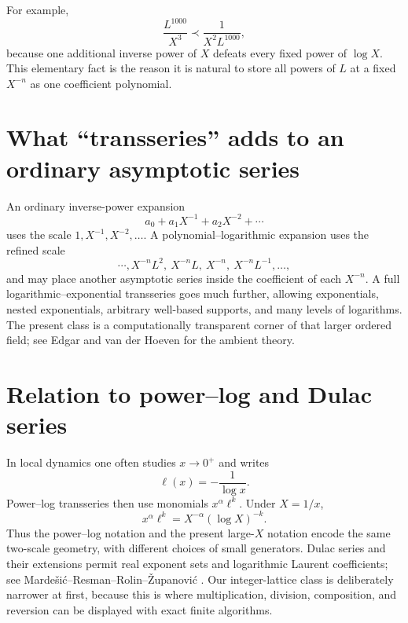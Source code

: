\documentclass[11pt,oneside]{book}
\theoremstyle{definition}
\theoremstyle{remark}
\newcommand{\precdom}{\prec}
\begin{document}
For example,
\[
 \frac{L^{1000}}{X^3}\precdom\frac{1}{X^2L^{1000}},
\]
because one additional inverse power of $X$ defeats every fixed power of
$\log X$.  This elementary fact is the reason it is natural to store all
powers of $L$ at a fixed $X^{-n}$ as one coefficient polynomial.

\section{What ``transseries'' adds to an ordinary asymptotic series}
An ordinary inverse-power expansion
\[
 a_0+a_1X^{-1}+a_2X^{-2}+\cdots
\]
uses the scale $1,X^{-1},X^{-2},\ldots$.  A polynomial--logarithmic expansion
uses the refined scale
\[
 \cdots, X^{-n}L^2,\ X^{-n}L,\ X^{-n},\ X^{-n}L^{-1},\ldots,
\]
and may place another asymptotic series inside the coefficient of each
$X^{-n}$.  A full logarithmic--exponential transseries goes much further,
allowing exponentials, nested exponentials, arbitrary well-based supports,
and many levels of logarithms.  The present class is a computationally
transparent corner of that larger ordered field; see Edgar
\cite{EdgarBeginners,EdgarComposition} and van der Hoeven
\cite{vdHoeven2006} for the ambient theory.

\section{Relation to power--log and Dulac series}
In local dynamics one often studies $x\to0^+$ and writes
\[
 \ell(x)=-\frac{1}{\log x}.
\]
Power--log transseries then use monomials $x^\alpha\ell^k$.  Under $X=1/x$,
\[
 x^\alpha\ell^k=X^{-\alpha}(\log X)^{-k}.
\]
Thus the power--log notation and the present large-$X$ notation encode the
same two-scale geometry, with different choices of small generators.  Dulac
series and their extensions permit real exponent sets and logarithmic
Laurent coefficients; see Marde\v{s}i\'c--Resman--Rolin--\v{Z}upanovi\'c
\cite{MRRZ2016}.  Our integer-lattice class is deliberately narrower at
first, because this is where multiplication, division, composition, and
reversion can be displayed with exact finite algorithms.
\end{document}
